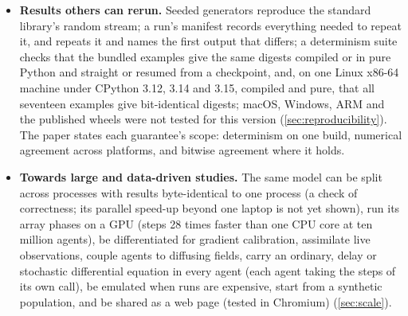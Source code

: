 \begin{itemize}[leftmargin=*,itemsep=2pt]
  order in which runs finish (\cref{sec:workflow}). Each method is checked against problems
  whose answers are known (\cref{sec:reproducibility}).
  \item \textbf{Results others can rerun.} Seeded generators reproduce the standard library's
  random stream; a run's manifest records everything needed to repeat it, and
   repeats it and names the first output that differs; a determinism suite
  checks that the bundled examples give the same digests compiled or in pure Python and
  straight or resumed from a checkpoint, and, on one Linux x86-64 machine under CPython 3.12,
  3.14 and 3.15, compiled and pure, that all seventeen examples give bit-identical digests;
  macOS, Windows, ARM and the published wheels were not tested for this
  version (\cref{sec:reproducibility}). The paper states each guarantee's scope: determinism on
  one build, numerical agreement across platforms, and bitwise agreement where it holds.
  \item \textbf{Towards large and data-driven studies.} The same model can be split across
  processes with results byte-identical to one process (a check of correctness; its parallel
  speed-up beyond one laptop is not yet shown), run its array phases on a GPU (steps 28 times
  faster than one CPU core at ten million agents), be differentiated for gradient calibration,
  assimilate live observations, couple agents to diffusing fields, carry an ordinary, delay or
  stochastic differential equation in every agent (each agent taking the steps of its own
   call), be emulated when runs are
  expensive, start from a synthetic population, and be shared as a web page (tested in
  Chromium) (\cref{sec:scale}).
\end{itemize}

